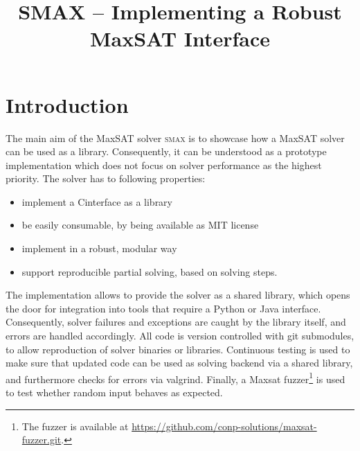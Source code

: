 \documentclass[conference]{IEEEtran}
\def\CC{{C\nolinebreak[4]\hspace{-.05em}\raisebox{.4ex}{\tiny\bf ++}}}
\begin{document}
    
\title{SMAX -- Implementing a Robust MaxSAT Interface}

\author{
}

\maketitle

\def\smax{\textsc{smax}\xspace}
\def\openwbo{\textsc{Open-WBO}\xspace}
\def\glucose{\textsc{Glucose~4.1}\xspace}
\def\minisat{\textsc{Minisat~2.2}\xspace}
\def\mergesat{\textsc{MergeSAT}\xspace}


\section{Introduction}

The main aim of the MaxSAT solver \smax is to showcase how a MaxSAT solver can be used as a library.
Consequently, it can be understood as a prototype implementation which does not focus on solver performance as the highest priority.
The solver has to following properties:
%
\begin{itemize}
 \item implement a \CC interface as a library
 \item be easily consumable, by being available as MIT license
 \item implement in a robust, modular way
 \item support reproducible partial solving, based on solving steps.
\end{itemize}
%
The implementation allows to provide the solver as a shared library, which opens the door for integration into tools that require a Python or Java interface.
Consequently, solver failures and exceptions are caught by the library itself, and errors are handled accordingly.
All code is version controlled with git submodules, to allow reproduction of solver binaries or libraries.
Continuous testing is used to make sure that updated code can be used as solving backend via a shared library, and furthermore checks for errors via valgrind.
Finally, a Maxsat fuzzer\footnote{The fuzzer is available at \url{https://github.com/conp-solutions/maxsat-fuzzer.git}.} is used to test whether random input behaves as expected.
\end{document}
